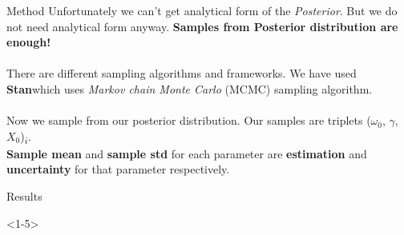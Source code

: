 \begin{frame}{Method}
Unfortunately we can't get analytical form of the \textit{Posterior}. But we do not need analytical form anyway. \textbf{Samples from Posterior distribution are enough!}
\\~\\
\pause
There are different sampling algorithms and frameworks. We have used \textbf{Stan}\footnotemark which uses \textit{Markov chain Monte Carlo} (MCMC) sampling algorithm.
\\~\\
\pause
Now we sample from our posterior distribution. Our samples are triplets ($\omega_0$, $\gamma$,$X_0$)\textsubscript{$i$}. \\
\textbf{Sample mean} and \textbf{sample std} for each parameter are \textbf{estimation} and \textbf{uncertainty} for that parameter respectively.


\end{frame}

\begin{frame}{Results}
\begin{onlyenv}<1-5>
\begin{figure}[h]
\end{figure}
\end{onlyenv}
\end{frame}


